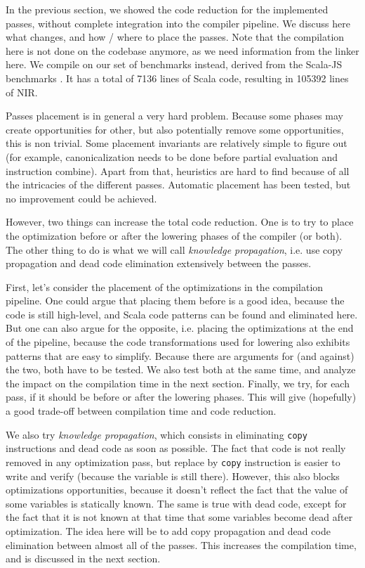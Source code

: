 \documentclass[12pt,a4paper]{article}
\newcommand{\nir}[1]{\texttt{#1}}
\begin{document}
In the previous section, we showed the code reduction for the implemented passes, without complete integration into the compiler pipeline. We discuss here what changes, and how / where to place the passes. Note that the compilation here is not done on the codebase anymore, as we need information from the linker here. We compile on our set of benchmarks instead, derived from the Scala-JS benchmarks \cite{scalajsbench}. It has a total of 7136 lines of Scala code, resulting in 105392 lines of NIR.

Passes placement is in general a very hard problem. Because some phases may create opportunities for other, but also potentially remove some opportunities, this is non trivial. Some placement invariants are relatively simple to figure out (for example, canonicalization needs to be done before partial evaluation and instruction combine). Apart from that, heuristics are hard to find because of all the intricacies of the different passes. Automatic placement has been tested, but no improvement could be achieved.

However, two things can increase the total code reduction. One is to try to place the optimization before or after the lowering phases of the compiler (or both). The other thing to do is what we will call \textit{knowledge propagation}, i.e. use copy propagation and dead code elimination extensively between the passes.

First, let's consider the placement of the optimizations in the compilation pipeline. One could argue that placing them before is a good idea, because the code is still high-level, and Scala code patterns can be found and eliminated here. But one can also argue for the opposite, i.e. placing the optimizations at the end of the pipeline, because the code transformations used for lowering also exhibits patterns that are easy to simplify. Because there are arguments for (and against) the two, both have to be tested. We also test both at the same time, and analyze the impact on the compilation time in the next section. Finally, we try, for each pass, if it should be before or after the lowering phases. This will give (hopefully) a good trade-off between compilation time and code reduction.

We also try \textit{knowledge propagation}, which consists in eliminating \nir{copy} instructions and dead code as soon as possible. The fact that code is not really removed in any optimization pass, but replace by \nir{copy} instruction is easier to write and verify (because the variable is still there). However, this also blocks optimizations opportunities, because it doesn't reflect the fact that the value of some variables is statically known. The same is true with dead code, except for the fact that it is not known at that time that some variables become dead after optimization. The idea here will be to add copy propagation and dead code elimination between almost all of the passes. This increases the compilation time, and is discussed in the next section.
\end{document}
